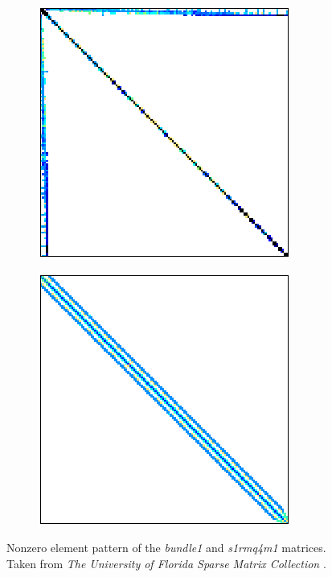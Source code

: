 \begin{figure}[ht!]
	\centering
	\begin{subfigure}{.5\textwidth}
		\centering
		\includegraphics[width=.7\textwidth, keepaspectratio, clip]{Images/ch3/matrices/bundle1.png}
		\label{Subfigure:comparing-decomposition-implementations-speedup-comparison-between-CM-and-different-ICMs-matrix-bundle1}
	\end{subfigure}%
	\begin{subfigure}{.5\textwidth}
		\centering
		\includegraphics[width=.7\textwidth, keepaspectratio, clip]{Images/ch3/matrices/s1rmq4m1.png}
		\label{Subfigure:comparing-decomposition-implementations-speedup-comparison-between-CM-and-different-ICMs-matrix-s1rmq4m1}
	\end{subfigure}
	\caption{Nonzero element pattern of the \textit{bundle1} and \textit{s1rmq4m1} matrices. Taken from \emph{The University of Florida Sparse Matrix Collection} \cite{Davis2011}.}
	\label{Figure:comparing-decomposition-implementations-speedup-comparison-between-CM-and-different-ICMs-matrices-bundle1-s1rmq4m1}
\end{figure}

